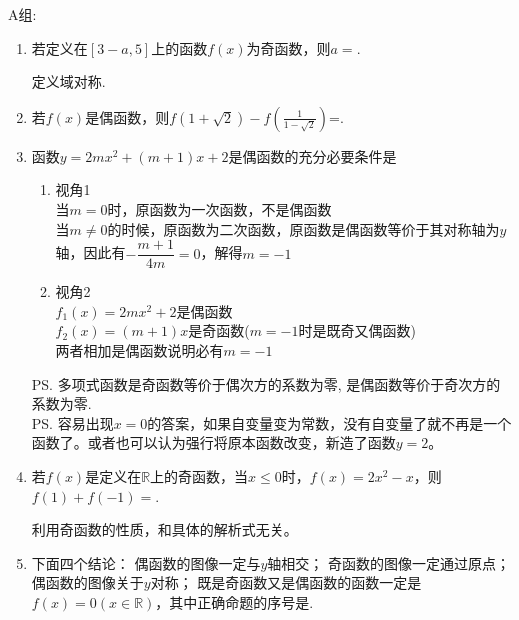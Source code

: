 A组:
\begin{enumerate}
\item 若定义在$[3-a,5]$上的函数$f(x)$为奇函数，则$a=$. 

\begin{jieda}
定义域对称.
\end{jieda}


\item 若$f(x)$是偶函数，则$f(1+\sqrt{2})-f(\frac{1}{1-\sqrt{2}})$=.


\item 函数$y=2m x^2+(m+1)x+2$是偶函数的充分必要条件是
\begin{jieda}
    \begin{enumerate}
        \item 视角1 \\
        当$m = 0$时，原函数为一次函数，不是偶函数\\
        当$m \neq 0$的时候，原函数为二次函数，原函数是偶函数等价于其对称轴为$y$轴，因此有$- \dfrac{m+1}{4m} = 0$，解得$m = -1$
        \item 视角2 \\
         $f_1(x) = 2m x^2 + 2$是偶函数 \\
         $f_2(x) = (m+1)x$是奇函数($m = -1$时是既奇又偶函数) \\
         两者相加是偶函数说明必有$m = -1$
    \end{enumerate}
    \ps 多项式函数是奇函数等价于偶次方的系数为零, 是偶函数等价于奇次方的系数为零. \\
    \ps 容易出现$x = 0$的答案，如果自变量变为常数，没有自变量了就不再是一个函数了。或者也可以认为强行将原本函数改变，新造了函数$y = 2$。
\end{jieda} 

\item 若$f(x)$是定义在$\mathbb{R}$上的奇函数，当$x\leqslant 0$时，$f(x)=2x^2-x$，则$f(1)+f(-1)=$.
\begin{jieda}
    利用奇函数的性质，和具体的解析式无关。
\end{jieda}

\item 下面四个结论： 偶函数的图像一定与$y$轴相交； 奇函数的图像一定通过原点；偶函数的图像关于$y$对称； 既是奇函数又是偶函数的函数一定是$f(x)=0(x\in \mathbb{R})$，其中正确命题的序号是.



\end{enumerate}


